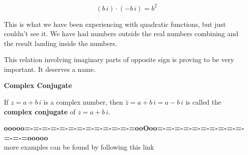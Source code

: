 \documentclass{ximera}
\begin{document}
\[
(b \, i) \cdot (-b \, i) = b^2
\]



This is what we have been experiencing with quadratic functions, but just couldn't see it.  We have had numbers outside the real numbers combining and the result landing inside the numbers.




This relation involving imaginary parts of opposite sign is proving to be very important.  It deserves a name.



\begin{definition} \textbf{\textcolor{green!50!black}{Complex Conjugate}}

If $z = a + b \, i$ is a complex number, then $\bar{z} = \overline{a + b \, i} = a - b \, i$ is called the \textbf{complex conjugate} of $z = a + b \, i$.

\end{definition}
















\begin{center}
\textbf{\textcolor{green!50!black}{ooooo=-=-=-=-=-=-=-=-=-=-=-=-=ooOoo=-=-=-=-=-=-=-=-=-=-=-=-=ooooo}} \\

more examples can be found by following this link\\ 

\end{center}
\end{document}
